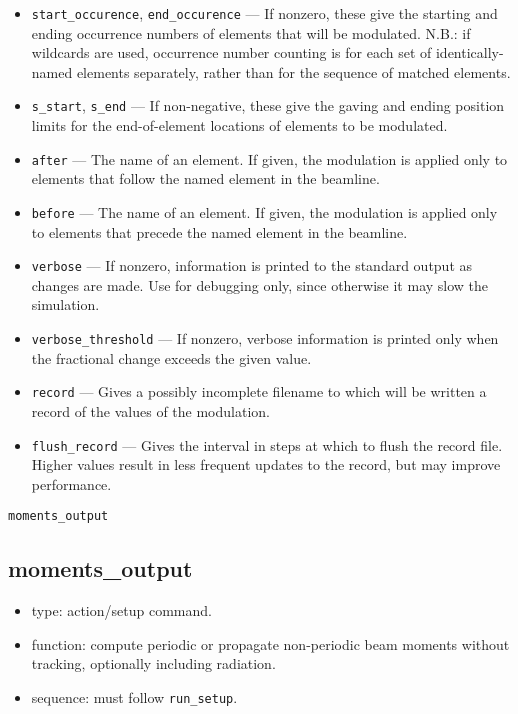 \documentclass[11pt]{article}
\begin{document}
\begin{itemize}
\item \verb|start_occurence|, \verb|end_occurence| --- If nonzero, these give the starting and
 ending occurrence numbers of elements that will be modulated. N.B.: if wildcards are used, occurrence
 number counting is for each set of identically-named elements separately, rather than for the sequence
 of matched elements.
\item \verb|s_start|, \verb|s_end| --- If non-negative, these give the gaving and ending position
 limits for the end-of-element locations of elements to be modulated.
\item \verb|after| --- The name of an element.  If given, the modulation is applied only to elements
 that follow the named element in the beamline.  
\item \verb|before| --- The name of an element.  If given, the modulation is applied only to elements
 that precede the named element in the beamline. 
\item \verb|verbose| --- If nonzero, information is printed to the standard output as changes are
        made.  Use for debugging only, since otherwise it may slow the simulation.
\item \verb|verbose_threshold| --- If nonzero, verbose information is printed only when the fractional change
   exceeds the given value.
\item \verb|record| --- Gives a possibly incomplete filename to which will be written a record of the values of
  the modulation.
\item \verb|flush_record| --- Gives the interval in steps at which to flush the record file. Higher values result
 in less frequent  updates to the record, but may improve performance.
\end{itemize}

\newpage
\begin{center}{\Large\verb|moments_output|}\end{center}
\subsection{moments\_output \label{subsec:momentsoutput}}

\begin{itemize}
\item type: action/setup command.
\item function: compute periodic or propagate non-periodic beam moments without tracking, optionally including radiation.
\item sequence: must follow \verb|run_setup|.
\end{itemize}
\end{document}
